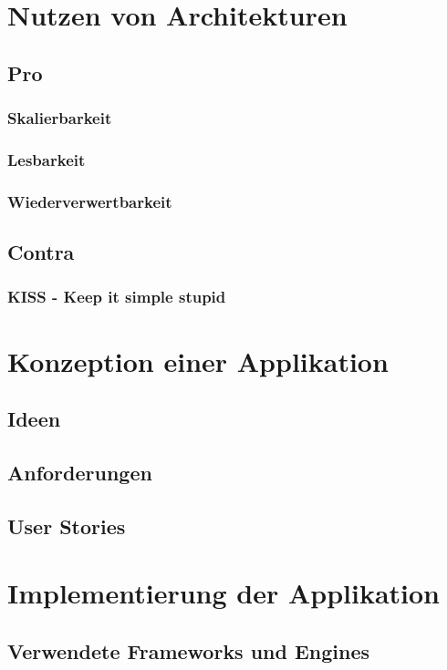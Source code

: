 \chapter{Nutzen von Architekturen}
\section{Pro}
\subsection{Skalierbarkeit}
\subsection{Lesbarkeit}
\subsection{Wiederverwertbarkeit}
\section{Contra}
\subsection{KISS - Keep it simple stupid}

\chapter{Konzeption einer Applikation}
\section{Ideen}
\section{Anforderungen}
\section{User Stories}

\chapter{Implementierung der Applikation}
\section{Verwendete Frameworks und Engines}
